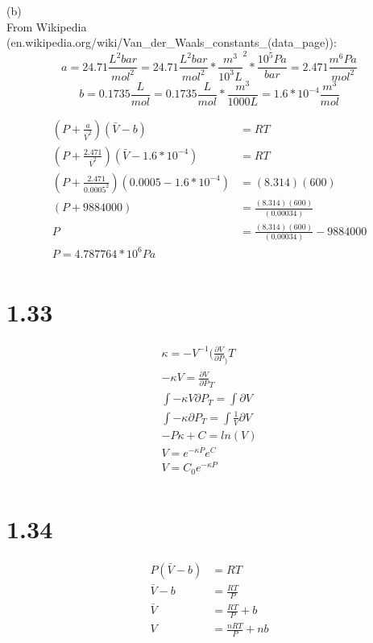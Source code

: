 \documentclass[10pt]{article} %
\begin{document}
(b)\\
From Wikipedia (en.wikipedia.org/wiki/Van\_der\_Waals\_constants\_(data\_page)):
$$a = 24.71 \frac{L^2bar}{mol^2} = 24.71 \frac{L^2bar}{mol^2} * \frac{m^3}{10^3 L}^2 * \frac{10^5 Pa}{bar} = 2.471 \frac{m^6Pa}{mol^2}$$
$$b = 0.1735\frac{L}{mol} = 0.1735\frac{L}{mol} * \frac{m^3}{1000 L} = 1.6*10^{-4} \frac{m^3}{mol}$$

\begin{align}
  (P+\frac{a}{\bar{V}^2})(\bar{V}-b) &= RT\\
  (P+\frac{2.471}{\bar{V}^2})(\bar{V} - 1.6*10^{-4}) &= RT\\
  (P+\frac{2.471}{0.0005^2})(0.0005 - 1.6*10^{-4}) &= (8.314)(600)\\
  (P+9884000) &= \frac{(8.314)(600)}{(0.00034)}\\
  P &= \frac{(8.314)(600)}{(0.00034)} - 9884000\\
  P = 4.787764 * 10^6 Pa\\
\end{align}

\section{1.33}

\begin{align}
  \kappa = -V^{-1}(\frac{\partial V}{\partial P}_)T\\
  -\kappa V = \frac{\partial V}{\partial P}_T\\
  \int -\kappa V \partial P_T = \int \partial V\\
  \int -\kappa \partial P_T = \int \frac{1}{V}\partial V\\
  -P\kappa + C= ln(V)\\
  V = e^{-\kappa P}e^{C}\\
  V = C_0e^{-\kappa P}\\
\end{align}

\section{1.34}

\begin{align}
  P(\bar{V}-b) &= RT\\
  \bar{V}-b &=\frac{RT}{P}\\
  \bar{V} &= \frac{RT}{P}+b\\
  V &= \frac{nRT}{P}+nb\\
\end{align}
\end{document}
